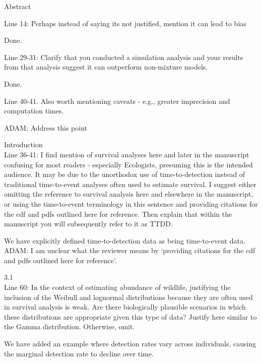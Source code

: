 \documentclass[12pt]{article}
\renewenvironment{quote}  %
              {\list{}{\rightmargin\leftmargin}\normalfont%
               \item\relax}
              {\endlist}
\newcommand{\adam}[1]{{\color{blue} ADAM: #1}}
\begin{document}
Abstract

Line 14: Perhaps instead of saying its not justified, mention it can lead to bias
\begin{quote}
Done.
\end{quote}

Line 29-31: Clarify that you conducted a simulation analysis and your results from that analysis suggest it can outperform non-mixture models.
\begin{quote}
Done.
\end{quote}

Line 40-41.  Also worth mentioning caveats - e.g., greater imprecision and computation times.
\begin{quote}
\adam{Address this point}
\end{quote}

Introduction\\
Line 36-41: I find mention of survival analyses here and later in the manuscript confusing for most readers - especially Ecologists, presuming this is the intended audience.  It may be due to the unorthodox use of time-to-detection instead of traditional time-to-event analyses often used to estimate survival.  I suggest either omitting the reference to survival analysis here and elsewhere in the manuscript, or using the time-to-event terminology in this sentence and providing citations for the cdf and pdfs outlined here for reference.  Then explain that within the manuscript you will subsequently refer to it as TTDD.  
\begin{quote}
We have explicitly defined time-to-detection data as being time-to-event data.\\
\adam{I am unclear what the reviewer means by `providing citations for the cdf and pdfs outlined here for reference'.}
\end{quote}

3.1 \\
Line 60: In the context of estimating abundance of wildlife, justifying the inclusion of the Weibull and lognormal distributions because they are often used in survival analysis is weak.  Are there biologically plausible scenarios in which these distributions are appropriate given this type of data?  Justify here similar to the Gamma distribution.  Otherwise, omit.
\begin{quote}
We have added an example where detection rates vary across individuals, causing the marginal detection rate to decline over time.
\end{quote}
\end{document}
